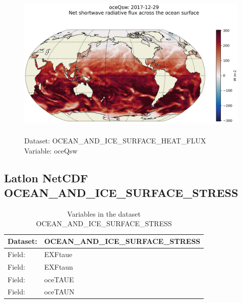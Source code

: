 \begin{figure}[H]
\centering
\includegraphics[scale=0.5]{../images/plots/latlon_plots/Ocean_and_Sea-Ice_Surface_Heat_Fluxes/oceQsw.png}
\caption{\\Dataset: OCEAN\_AND\_ICE\_SURFACE\_HEAT\_FLUX\\Variable: oceQsw}
\label{tab:table-OCEAN_AND_ICE_SURFACE_HEAT_FLUX_oceQsw-Plot}
\end{figure}
\pagebreak
\subsection{Latlon NetCDF OCEAN\_AND\_ICE\_SURFACE\_STRESS}
\newp
\begin{longtable}{|p{}|p{}|}
\caption{Variables in the dataset OCEAN\_AND\_ICE\_SURFACE\_STRESS}
\label{tab:table-OCEAN_AND_ICE_SURFACE_STRESS-fields} \\ 
\hline \endhead \hline \endfoot
\rowcolor{lightgray} \textbf{Dataset:} & \textbf{OCEAN\_AND\_ICE\_SURFACE\_STRESS} \\ \hline
Field: &EXFtaue \\ \hline
Field: &EXFtaun \\ \hline
Field: &oceTAUE \\ \hline
Field: &oceTAUN \\ \hline
\end{longtable}

\pagebreak
